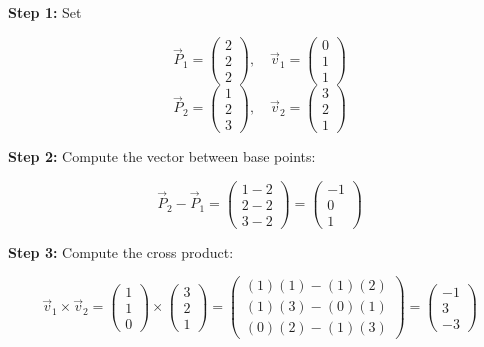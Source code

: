 \textbf{Step 1:} Set

\[
	\vec{P}_1 = \begin{pmatrix} 2 \\ 2 \\ 2 \end{pmatrix}, \quad \vec{v}_1 = \begin{pmatrix} 0 \\ 1 \\ 1 \end{pmatrix}
\]
\[
	\vec{P}_2 = \begin{pmatrix} 1 \\ 2 \\ 3 \end{pmatrix}, \quad \vec{v}_2 = \begin{pmatrix} 3 \\ 2 \\ 1 \end{pmatrix}
\]

\textbf{Step 2:} Compute the vector between base points:

\[
	\vec{P}_2 - \vec{P}_1 = \begin{pmatrix} 1 - 2 \\ 2 - 2 \\ 3 - 2 \end{pmatrix} = \begin{pmatrix} -1 \\ 0 \\ 1 \end{pmatrix}
\]

\textbf{Step 3:} Compute the cross product:

\[
	\vec{v}_1 \times \vec{v}_2 =
	\begin{pmatrix} 1 \\ 1 \\ 0 \end{pmatrix} \times \begin{pmatrix} 3 \\ 2 \\ 1 \end{pmatrix}
	= \begin{pmatrix}
		(1)(1) - (1)(2) \\
		(1)(3) - (0)(1) \\
		(0)(2) - (1)(3)
	\end{pmatrix}
	= \begin{pmatrix}
		-1 \\ 3 \\ -3
	\end{pmatrix}
\]

